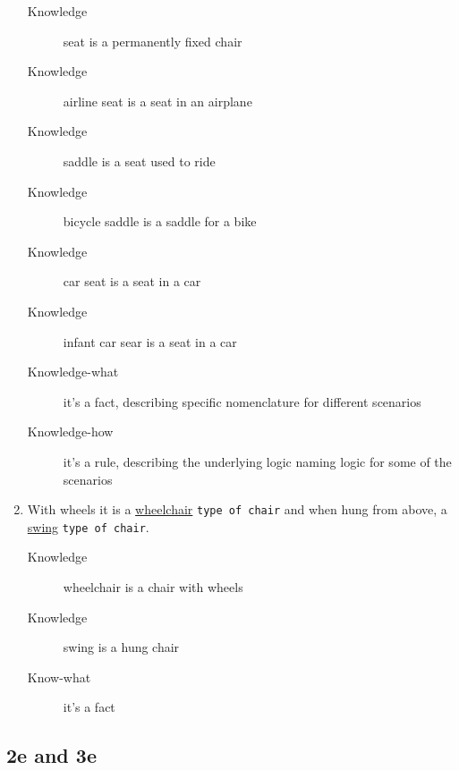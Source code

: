 \documentclass[a4paper,10pt,twoside,twocolumn]{article}
\begin{document}
\begin{enumerate}
\begin{description}
\item[{Knowledge}] seat is a permanently fixed chair
\item[{Knowledge}] airline seat is a seat in an airplane
\item[{Knowledge}] saddle is a seat used to ride
\item[{Knowledge}] bicycle saddle is a saddle for a bike
\item[{Knowledge}] car seat is a seat in a car
\item[{Knowledge}] infant car sear is a seat in a car
\item[{Knowledge-what}] it's a fact, describing specific nomenclature for different scenarios
\item[{Knowledge-how}] it's a rule, describing the underlying logic naming logic for some of the scenarios
\end{description}
\item With wheels it is a \uline{wheelchair} \texttt{type of chair} and when hung from above, a \uline{swing} \texttt{type of chair}.
\begin{description}
\item[{Knowledge}] wheelchair is a chair with wheels
\item[{Knowledge}] swing is a hung chair
\item[{Know-what}] it's a fact
\end{description}
\end{enumerate}

\subsection{2e and 3e}
\label{sec:org28bc229}
\end{document}
